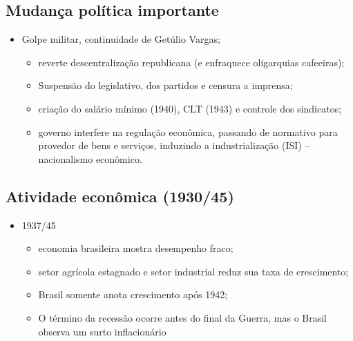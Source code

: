 \documentclass[a4paper,12pt]{article}[abntex2]
\begin{document}
\subsection{Mudança política importante}
\begin{itemize}
    \item Golpe militar, continuidade de Getúlio Vargas;
    \begin{itemize}
        \item reverte descentralização republicana (e enfraquece oligarquias cafeeiras);
    \end{itemize}
    \begin{itemize}
        \item Suspensão do legislativo, dos partidos e censura a imprensa;
    \end{itemize}
    \begin{itemize}
        \item criação do salário mínimo (1940), CLT (1943) e controle dos sindicatos;
    \end{itemize}
    \begin{itemize}
        \item governo interfere na regulação econômica, passando de normativo para provedor de bens e serviços, induzindo a industrialização (ISI) – nacionalismo econômico.
    \end{itemize}
\end{itemize}

\subsection{Atividade econômica (1930/45)}
\begin{itemize}
    \item 1937/45
    \begin{itemize}
        \item economia brasileira mostra desempenho fraco;
    \end{itemize}
    \begin{itemize}
        \item setor agrícola estagnado e setor industrial reduz sua taxa de crescimento;
    \end{itemize}
    \begin{itemize}
        \item Brasil somente anota crescimento após 1942;
    \end{itemize}
    \begin{itemize}
        \item O término da recessão ocorre antes do final da Guerra, mas o Brasil observa um surto inflacionário
    \end{itemize}
\end{itemize}
\end{document}
